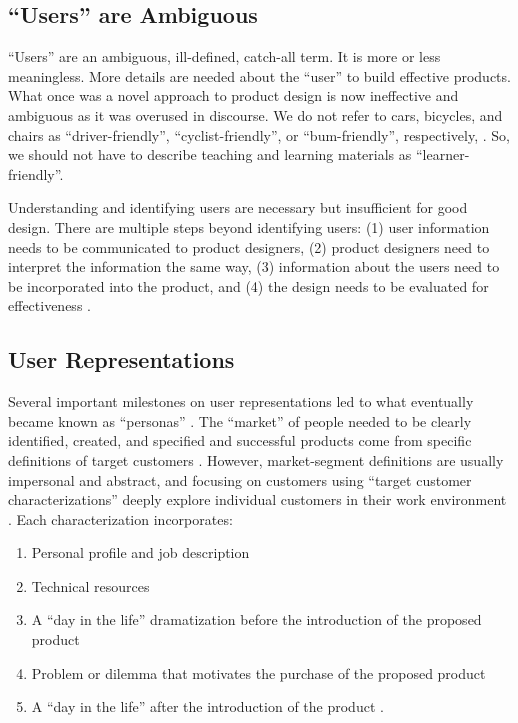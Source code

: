 \documentclass[010-intro.tex]{subfiles}
\begin{document}
\subsection{``Users'' are Ambiguous}

    ``Users'' are an ambiguous, ill-defined, catch-all term.
    It is more or less meaningless.
    More details are needed about the ``user'' to build effective products.
    What once was a novel approach to product design is now ineffective and ambiguous as it was overused in discourse.
    We do not refer to cars, bicycles, and chairs as
    ``driver-friendly'',
    ``cyclist-friendly'', or
    ``bum-friendly'', respectively,
    \cite{pruittPersonaLifecycleKeeping2006}.
    So, we should not have to describe teaching and learning materials as ``learner-friendly''.

    Understanding and identifying users are necessary but insufficient for good design.
    There are multiple steps beyond identifying users:
    (1) user information needs to be communicated to product designers,
    (2) product designers need to interpret the information the same way,
    (3) information about the users need to be incorporated into the product, and
    (4) the design needs to be evaluated for effectiveness
    \cite{pruittPersonaLifecycleKeeping2006}.

\subsection{User Representations}

    Several important milestones on user representations led to what eventually became known as ``personas''
    \cite{pruittPersonaLifecycleKeeping2006}.
    The ``market'' of people needed to be clearly identified, created, and specified and
    successful products come from specific definitions of target customers
    \cite{sissorsWhatMarket1966, winstonDefiningYourMarket1998, pruittPersonaLifecycleKeeping2006}.
    However, market-segment definitions are usually impersonal and abstract, and focusing on
    customers using ``target customer characterizations'' deeply explore individual customers in their work environment
    \cite{mooreCrossingChasmMarketing1991, pruittPersonaLifecycleKeeping2006}.
    Each characterization incorporates:

    \begin{enumerate}
        \item Personal profile and job description
        \item Technical resources
        \item A ``day in the life'' dramatization before the introduction of the proposed product
        \item Problem or dilemma that motivates the purchase of the proposed product
        \item A ``day in the life'' after the introduction of the product
            \cite{mooreCrossingChasmMarketing1991, pruittPersonaLifecycleKeeping2006}.
    \end{enumerate}
\end{document}
